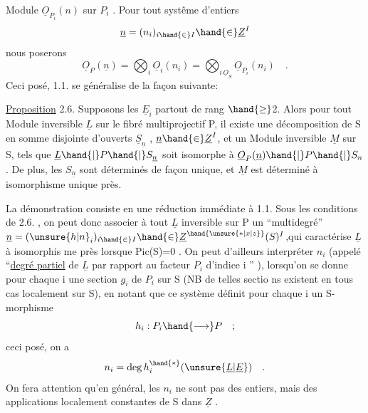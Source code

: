 
Module  $\underline{O}_{P_i}(n)$ sur $P_i$ . Pour tout systême d'entiers
\[ \underline{n} = (n_i)_{i \hand{\in} I} \hand{\in} \underline{Z}^I \]
nous  poserons
\[ \underline{O}_P(\underline{n}) = \bigotimes_i \underline{O}_i(n_i) = \bigotimes_{i\,\underline{O}_S} \underline{O}_{P_i}(n_i) \quad . \]
Ceci posé, 1.1. se généralise de la façon suivante:

\uline{Proposition} 2.6. Supposons les $\underline{E}_i$ partout de rang $\hand{\geq}$2. Alors pour tout
Module inversible $\underline{L}$ sur le fibré multiprojectif P, il existe une
 décomposition de S en somme disjointe d'ouverts $\underline{S}_{\underline{n}}$ , $\underline{n} \hand{\in} \underline{Z}^I$,
et  un Module inversible $\underline{M}$ sur S, tels que $\underline{L}\hand{|}P\hand{|}S_{\underline{n}}$
soit isomorphe à $\underline{O}_P(\underline{n})\hand{|}P\hand{|}S_n$ . De plus, les $S_{\underline{n}}$ sont déterminés de façon
unique, et  $\underline{M}$ est déterminé à isomorphisme unique près.

 La démonstration  consiste en une réduction immédiate à 1.1.
Sous les conditions de 2.6. , on peut donc associer à tout $\underline{L}$ inversible
sur P un ``multidegré'' $\underline{n} = (\unsure{h|n}_i)_{i \hand{\in} I} \hand{\in} \underline{Z}^{\hand{\unsure{*|x|z}}}(S)^I$,qui caractérise $\underline{L}$ à isomorphis
me près lorsque Pic(S)=0 . On peut d'ailleurs interpréter $n_i$ (appelé
``\uline{degré partiel} de $\underline{L}$ par rapport au facteur $P_i$ d'indice i '' ), lorsqu'on
se donne pour chaque i une section $g_i$ de $P_i$ sur S (NB de telles sectio
ns existent en tous cas localement sur S), en notant que ce système définit
pour chaque i un S-morphisme 
\[ h_i : P_i \hand{\longrightarrow} P \quad ; \]
ceci posé, on a
\[ n_i = \deg h_i^{\hand{*}}(\unsure{\underline{L}|\underline{E}}) \quad . \]
On fera attention qu'en général, les $n_i$ ne sont pas des entiers, mais des
applications localement constantes de S dans $\underline{Z}$ .

